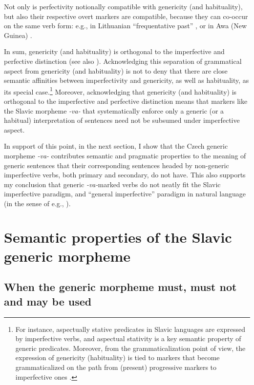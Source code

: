 \documentclass[output=paper,colorlinks,citecolor=brown]{langscibook}
\begin{document}
Not only is perfectivity notionally compatible with genericity (and habituality),
but also their respective overt markers are compatible,
because they can co-occur on the same verb form: e.g., in Lithuanian ``frequentative past'' \citep{dambriunas-etal-1966}, or in Awa (New Guinea) \citep{loving1964mckaughan}.

\newpage
In sum, genericity (and habituality) is orthogonal to the imperfective and perfective distinction (see also \citealt{filip1997suigenva}).
Acknowledging this separation of grammatical
aspect from genericity (and habituality) is not to deny that there
are close semantic affinities between imperfectivity
and genericity, as well as habituality,
as its special case.\footnote{For instance, aspectually stative predicates in Slavic languages are expressed by imperfective verbs, and aspectual stativity is a key semantic property of
generic predicates. Moreover, from the grammaticalization point of view, the expression of genericity (habituality) is tied to markers that become grammaticalized on the path from (present) progressive markers to imperfective ones \citep{bybee1989dahl}.}
Moreover, acknowledging that genericity (and habituality) is orthogonal to the imperfective and perfective distinction
means that markers like the Slavic morpheme \textit{-va-}
that systematically enforce
only a generic (or a habitual) interpretation of sentences
need not be subsumed under imperfective aspect.

In support of this point, in the next section, I
show that the Czech generic morpheme \textit{-va-}
contributes semantic and pragmatic properties
to the meaning of generic sentences
that their corresponding sentences headed by non-generic imperfective verbs, both primary and secondary, do not have. This also supports my conclusion that generic
\textit{-va-}marked verbs do not neatly fit the Slavic imperfective paradigm,
and ``general imperfective'' paradigm in natural language (in the sense of e.g., \citealt{Comrie1976}).




\section{Semantic properties of the Slavic generic morpheme}\label{semprag}


\subsection{When the generic morpheme must, must not and may be used}\label{delimitingVA}
\end{document}

